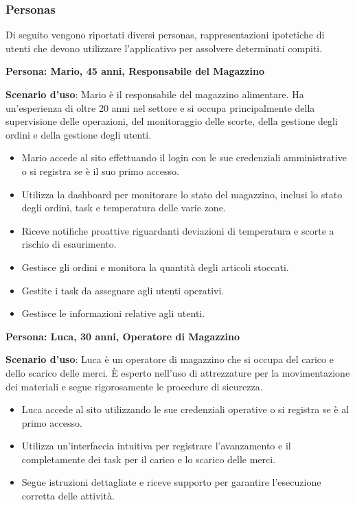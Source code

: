 \subsubsection{Personas}

Di seguito vengono riportati diversi personas, rappresentazioni ipotetiche di utenti che devono utilizzare l’applicativo per assolvere determinati compiti.

\textbf{Persona: Mario, 45 anni, Responsabile del Magazzino}

\textbf{Scenario d’uso}: Mario è il responsabile del magazzino alimentare. Ha un'esperienza di oltre 20 anni nel settore e si occupa principalmente della supervisione delle operazioni, del monitoraggio delle scorte, della gestione degli ordini e della gestione degli utenti.

\begin{itemize}
    \item Mario accede al sito effettuando il login con le sue credenziali amministrative o si registra se è il suo primo accesso.
    \item Utilizza la dashboard per monitorare lo stato del magazzino, inclusi lo stato degli ordini, task e temperatura delle varie zone.
    \item Riceve notifiche proattive riguardanti deviazioni di temperatura e scorte a rischio di esaurimento.
    \item Gestisce gli ordini e monitora la quantità degli articoli stoccati.
    \item Gestite i task da assegnare agli utenti operativi.
    \item Gestisce le informazioni relative agli utenti.
\end{itemize}

\textbf{Persona: Luca, 30 anni, Operatore di Magazzino}

\textbf{Scenario d’uso}: Luca è un operatore di magazzino che si occupa del carico e dello scarico delle merci. È esperto nell'uso di attrezzature per la movimentazione dei materiali e segue rigorosamente le procedure di sicurezza.

\begin{itemize}
    \item Luca accede al sito utilizzando le sue credenziali operative o si registra se è al primo accesso.
    \item Utilizza un’interfaccia intuitiva per registrare l'avanzamento e il completamente dei task per il carico e lo scarico delle merci.
    \item Segue istruzioni dettagliate e riceve supporto per garantire l’esecuzione corretta delle attività.
\end{itemize}

